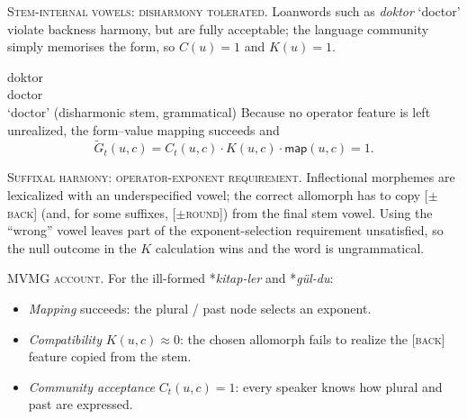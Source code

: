 \documentclass[12pt,letterpaper]{article}
\newcommand{\mention}[1]{\textit{#1}}
\begin{document}
\textsc{Stem-internal vowels: disharmony tolerated.}
Loanwords such as \mention{doktor} `doctor' violate backness harmony, but are fully acceptable;
the language community simply memorises the form, so $C(u)=1$ and $K(u)=1$.

\ea \label{ex:doktor}
\gll doktor \\
     doctor\\
\glt `doctor' (disharmonic stem, grammatical)
\z
Because no operator feature is left unrealized, the form--value mapping succeeds and
\begin{equation*}
\widetilde{G}_t(u,c)=C_t(u,c)\cdot K(u,c)\cdot\mathsf{map}(u,c)=1.
\end{equation*}

\textsc{Suffixal harmony: operator-exponent requirement.}
Inflectional morphemes are lexicalized with an underspecified vowel;
the correct allomorph has to copy \textsc{[$\pm$back]} (and, for some
suffixes, \textsc{[$\pm$round]}) from the final stem vowel.
Using the \enquote{wrong} vowel leaves part of the exponent-selection requirement
unsatisfied, so the null outcome in the $K$ calculation wins and the word is
ungrammatical.

\ea  \label{ex:kitap-pl}
\z
\z

\ea \label{ex:gul-past}
\z
\z

\textsc{MVMG account.}
For the ill-formed *\mention{kitap-ler} and *\mention{gül-du}:

\begin{itemize}
\item \emph{Mapping} succeeds: the plural / past node selects an exponent.
\item \emph{Compatibility} $K(u,c)\approx 0$: the chosen allomorph fails to realize the
      \textsc{[back]} feature copied from the stem.
\item \emph{Community acceptance} $C_t(u,c)=1$: every speaker knows how plural
      and past are expressed.
\end{itemize}
\end{document}

